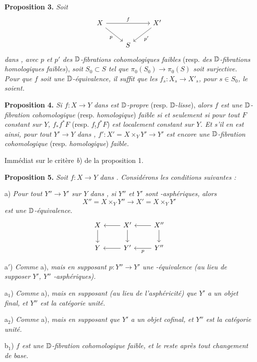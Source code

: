 
\textbf{Proposition 3.} \textit{Soit}
\[
\begin{tikzcd}
X \arrow[rr, "f"] \arrow[dr, "p"'] & & X' \arrow[dl, "p'"] \\
& S &
\end{tikzcd}
\]
\textit{dans \Dia, avec $p$ et $p'$ des $\mathbb{D}$-fibrations cohomologiques faibles} (resp. \textit{des $\mathbb{D}$-fibrations homologiques faibles}), \textit{soit $S_0 \subset S$ tel que $\pi_0(S_0) \to \pi_0(S)$ soit surjective. Pour que $f$ soit une $\mathbb{D}$-équivalence, il suffit que les $f_s : X_s \to X'_s$, pour $s \in S_0$, le soient.}

\textbf{Proposition 4.} \textit{Si $f : X \to Y$ dans \Dia{} est $\mathbb{D}$-propre} (resp. $\mathbb{D}$-\textit{lisse}), \textit{alors $f$ est une $\mathbb{D}$-fibration cohomologique} (resp. \textit{homologique}) \textit{faible si et seulement si pour tout $F$ constant sur $Y$, $f_*f^*F$} (resp. $f_!f^*F$) \textit{est localement constant sur $Y$. Et s'il en est ainsi, pour tout $Y' \to Y$ dans \Dia, $f' : X' = X \times_Y Y' \to Y'$ est encore une $\mathbb{D}$-fibration cohomologique} (resp. \textit{homologique}) \textit{faible.}

Immédiat sur le critère \textit{b}) de la proposition 1.

\textbf{Proposition 5.} \textit{Soit $f : X \to Y$ dans \Dia. Considérons les conditions suivantes :}

a) \textit{Pour tout $Y'' \to Y'$ sur $Y$ dans \Dia, si $Y''$ et $Y'$ sont \Hot-asphériques, alors}
\[
X'' = X \times_Y Y'' \longrightarrow X' = X \times_Y Y'
\]
\textit{est une $\mathbb{D}$-équivalence.}
\[
\begin{tikzcd}
X & X' \arrow[l] & X'' \arrow[l] \\
Y \arrow[from=u] & Y' \arrow[l] \arrow[from=u] & Y'' \arrow[l, "p"] \arrow[from=u]
\end{tikzcd}
\]

a$'$) \textit{Comme} a), \textit{mais en supposant $p : Y'' \to Y'$ une \Hot-équivalence (au lieu de supposer $Y'$, $Y''$ \Hot-asphériques).}

a$_1$) \textit{Comme} a), \textit{mais en supposant (au lieu de l'asphéricité) que $Y'$ a un objet final, et $Y''$ est la catégorie unité.}

a$_2$) \textit{Comme} a), \textit{mais en supposant que $Y'$ a un objet cofinal, et $Y''$ est la catégorie unité.}

b$_1$) \textit{$f$ est une $\mathbb{D}$-fibration cohomologique faible, et le reste après tout changement de base.}

